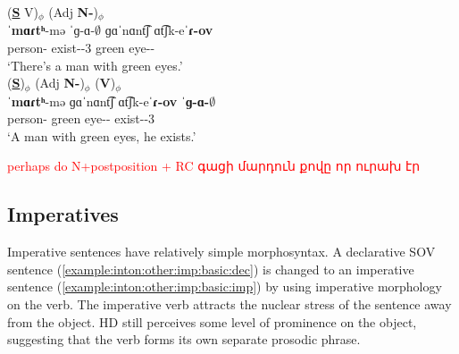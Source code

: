 \begin{exe}
	\ex\label{ex:inton:extrapose:ins}
	\begin{xlist}
		\ex \glll (\textbf{\underline{S}} V)$_\phi$ (Adj \textbf{N-{\ins}})$_\phi$ \\
		ˈ\textbf{mɑɾtʰ}-mə  ˈɡ-ɑ-$\emptyset$ ɡɑˈnɑnt͡ʃ ɑt͡ʃk-eˈ\textbf{ɾ-ov} \\ 
		person-{\indf}  exist-{\thgloss}-3{\sg} green eye-{\pl}-{\ins} \\
		\trans `There's a man with green eyes.' 
		\label{ex:inton:extrapose:ins:extrapos}
		\\ 
		\ex \glll (\textbf{\underline{S}})$_\phi$ (Adj \textbf{N-{\ins}})$_\phi$  (\textbf{V})$_\phi$\\
		ˈ\textbf{mɑɾtʰ}-mə  ɡɑˈnɑnt͡ʃ ɑt͡ʃk-eˈ\textbf{ɾ-ov}   ˈ\textbf{ɡ-ɑ-$\emptyset$} \\ 
		person-{\indf} green eye-{\pl}-{\ins}  exist-{\thgloss}-3{\sg} \\
		\trans `A man with green eyes, he exists.' 
		\label{ex:inton:extrapose:ins:noextrapose}
		\\ 
	\end{xlist}
\end{exe}



\textcolor{red}{perhaps do N+postposition + RC գացի մարդուն քովը որ ուրախ էր}

\subsection{Imperatives}\label{section:intonation:other:imperative}

Imperative sentences have relatively simple morphosyntax. A declarative SOV sentence (\ref{example:inton:other:imp:basic:dec}) is changed to an imperative sentence (\ref{example:inton:other:imp:basic:imp}) by using imperative morphology on the verb. The imperative verb attracts the nuclear stress of the sentence away from the object. HD still perceives some level of prominence on the object,  suggesting that the verb forms its own separate prosodic phrase. 

